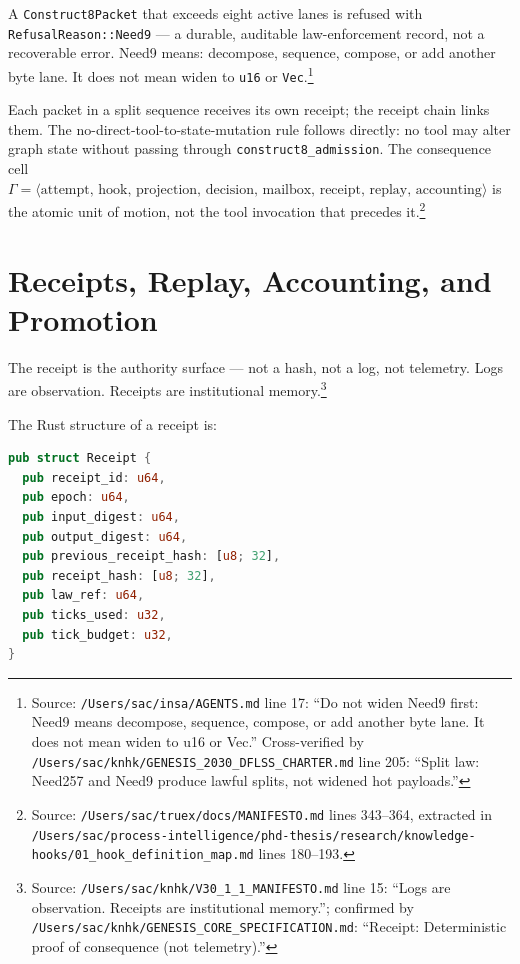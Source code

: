 A \texttt{Construct8Packet} that exceeds eight active lanes is refused with
\texttt{RefusalReason::Need9} --- a durable, auditable law-enforcement record, not a
recoverable error. Need9 means: decompose, sequence, compose, or add another byte lane. It
does not mean widen to \texttt{u16} or \texttt{Vec}.\footnote{Source:
\texttt{/Users/sac/insa/AGENTS.md} line 17: ``Do not widen Need9 first: Need9 means decompose,
sequence, compose, or add another byte lane. It does not mean widen to u16 or Vec.'' Cross-verified
by \texttt{/Users/sac/knhk/GENESIS\_2030\_DFLSS\_CHARTER.md} line 205: ``Split law: Need257 and
Need9 produce lawful splits, not widened hot payloads.''}

Each packet in a split sequence receives its own receipt; the receipt chain links them.
The no-direct-tool-to-state-mutation rule follows directly: no tool may alter graph state
without passing through \texttt{construct8\_admission}. The consequence cell $\Gamma =
\langle\text{attempt, hook, projection, decision, mailbox, receipt, replay,
accounting}\rangle$ is the atomic unit of motion, not the tool invocation that precedes
it.\footnote{Source: \texttt{/Users/sac/truex/docs/MANIFESTO.md} lines 343--364, extracted in
\texttt{/Users/sac/process-intelligence/phd-thesis/research/knowledge-hooks/01\_hook\_definition\_map.md}
lines 180--193.}

\section{Receipts, Replay, Accounting, and Promotion}
\label{sec:receipts-replay-aka}

The receipt is the authority surface --- not a hash, not a log, not telemetry. Logs are
observation. Receipts are institutional memory.\footnote{Source:
\texttt{/Users/sac/knhk/V30\_1\_1\_MANIFESTO.md} line 15: ``Logs are observation. Receipts are
institutional memory.''; confirmed by
\texttt{/Users/sac/knhk/GENESIS\_CORE\_SPECIFICATION.md}: ``Receipt: Deterministic proof of
consequence (not telemetry).''}

The Rust structure of a receipt is:

\begin{lstlisting}[language=Rust,caption={Receipt structure},label={lst:receipt}]
pub struct Receipt {
  pub receipt_id: u64,
  pub epoch: u64,
  pub input_digest: u64,
  pub output_digest: u64,
  pub previous_receipt_hash: [u8; 32],
  pub receipt_hash: [u8; 32],
  pub law_ref: u64,
  pub ticks_used: u32,
  pub tick_budget: u32,
}
\end{lstlisting}

